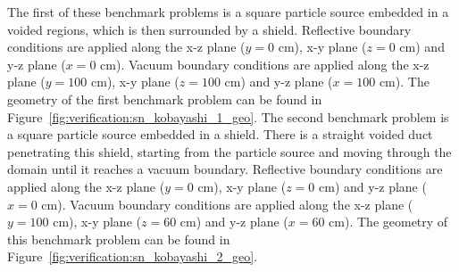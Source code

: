 The first of these benchmark problems is a square particle source embedded in a voided regions, which is then surrounded by a shield. Reflective boundary conditions are applied along the x-z plane ($y = 0\text{ cm}$), x-y plane ($z = 0\text{ cm}$) and y-z plane ($x = 0\text{ cm}$). Vacuum boundary conditions are applied along the x-z plane ($y = 100\text{ cm}$), x-y plane ($z = 100\text{ cm}$) and y-z plane ($x = 100\text{ cm}$). The geometry of the first benchmark problem can be found in Figure~\ref{fig:verification:sn_kobayashi_1_geo}. The second benchmark problem is a square particle source embedded in a shield. There is a straight voided duct penetrating this shield, starting from the particle source and moving through the domain until it reaches a vacuum boundary. Reflective boundary conditions are applied along the x-z plane ($y = 0\text{ cm}$), x-y plane ($z = 0\text{ cm}$) and y-z plane ($x = 0\text{ cm}$). Vacuum boundary conditions are applied along the x-z plane ($y = 100\text{ cm}$), x-y plane ($z = 60\text{ cm}$) and y-z plane ($x = 60\text{ cm}$). The geometry of this benchmark problem can be found in Figure~\ref{fig:verification:sn_kobayashi_2_geo}.
